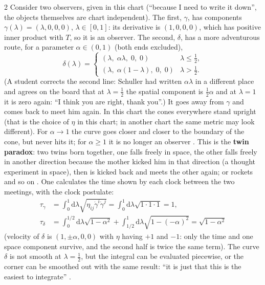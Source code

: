 \begin{paracol}{2}
Consider two observers, given in this chart (``because I need to write it down'', the objects themselves are chart independent). The first, $\gamma$, has components $\gamma(\lambda)=(\lambda,0,0,0)$, $\lambda\in[0,1]$: its derivative is $(1,0,0,0)$, which has positive inner product with $T$, so it is an observer. The second, $\delta$, has a more adventurous route, for a parameter $\alpha\in(0,1)$ (both ends excluded),
\[
  \delta(\lambda)=\begin{cases}(\lambda,\;\alpha\lambda,\;0,\;0)&\lambda\le\tfrac12,\\[2pt](\lambda,\;\alpha(1-\lambda),\;0,\;0)&\lambda>\tfrac12.\end{cases}
\]
(A student corrects the second line: Schuller had written $\alpha\lambda$ in a different place and agrees on the board that at $\lambda=\tfrac12$ the spatial component is $\tfrac12\alpha$ and at $\lambda=1$ it is zero again: ``I think you are right, thank you''.) It goes away from $\gamma$ and comes back to meet him again. In this chart the cones everywhere stand upright (that is the choice of $\eta$ in this chart; in another chart the same metric may look different). For $\alpha\to1$ the curve goes closer and closer to the boundary of the cone, but never hits it; for $\alpha\ge1$ it is no longer an observer .
This is the \textbf{twin paradox}: two twins born together, one falls freely in space, the other falls freely in another direction because the mother kicked him in that direction (a thought experiment in space), then is kicked back and meets the other again; or rockets and so on . One calculates the time shown by each clock between the two meetings, with the clock postulate:
\begin{align*}
  \tau_\gamma&=\int_0^1\mathrm d\lambda\sqrt{\eta_{ij}\dot\gamma^i\dot\gamma^j}=\int_0^1\mathrm d\lambda\sqrt{1\cdot1\cdot1}=1,\\
  \tau_\delta&=\int_0^{1/2}\mathrm d\lambda\sqrt{1-\alpha^2}+\int_{1/2}^1\mathrm d\lambda\sqrt{1-(-\alpha)^2}=\sqrt{1-\alpha^2}
\end{align*}
(velocity of $\delta$ is $(1,\pm\alpha,0,0)$ with $\eta$ having $+1$ and $-1$: only the time and one space component survive, and the second half is twice the same term). The curve $\delta$ is not smooth at $\lambda=\tfrac12$, but the integral can be evaluated piecewise, or the corner can be smoothed out with the same result: ``it is just that this is the easiest to integrate'' .

\end{paracol}
